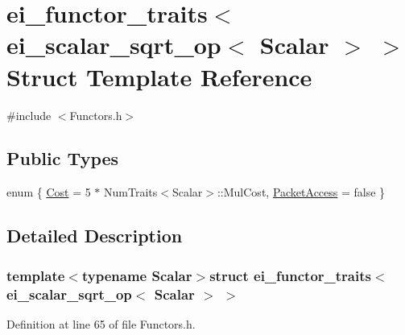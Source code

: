 \hypertarget{structei__functor__traits_3_01ei__scalar__sqrt__op_3_01_scalar_01_4_01_4}{\section{ei\-\_\-functor\-\_\-traits$<$ ei\-\_\-scalar\-\_\-sqrt\-\_\-op$<$ Scalar $>$ $>$ Struct Template Reference}
\label{structei__functor__traits_3_01ei__scalar__sqrt__op_3_01_scalar_01_4_01_4}
}


{\ttfamily \#include $<$Functors.\-h$>$}

\subsection*{Public Types}
\begin{DoxyCompactItemize}
\item 
enum \{ \hyperlink{structei__functor__traits_3_01ei__scalar__sqrt__op_3_01_scalar_01_4_01_4_ace1ec4dbe78fe702a6a4e27dfe5afabda1638861c883fcd4b70a1651cab5d8d64}{Cost} = 5 $\ast$ Num\-Traits$<$Scalar$>$\-:\-:Mul\-Cost, 
\hyperlink{structei__functor__traits_3_01ei__scalar__sqrt__op_3_01_scalar_01_4_01_4_ace1ec4dbe78fe702a6a4e27dfe5afabda49e54377bdc62171dde46cbd5c4cb22b}{Packet\-Access} = false
 \}
\end{DoxyCompactItemize}


\subsection{Detailed Description}
\subsubsection*{template$<$typename Scalar$>$struct ei\-\_\-functor\-\_\-traits$<$ ei\-\_\-scalar\-\_\-sqrt\-\_\-op$<$ Scalar $>$ $>$}



Definition at line 65 of file Functors.\-h.



